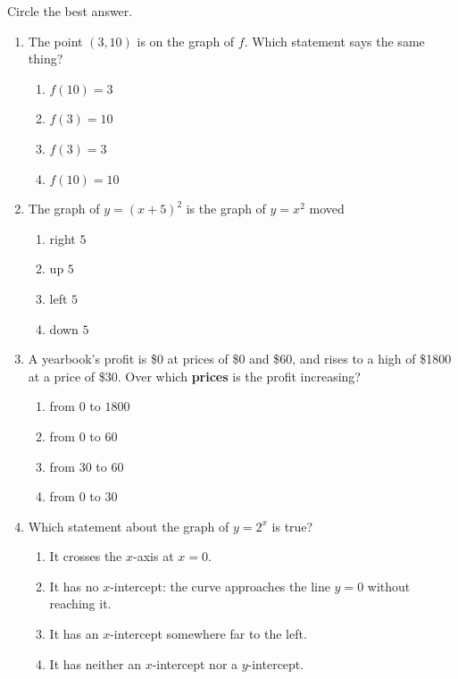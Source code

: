 
\noindent\small Circle the best answer.

\begin{enumerate}[leftmargin=1.8em, itemsep=6pt, topsep=5pt]
\small

\item The point $(3,10)$ is on the graph of $f$. Which statement says the same thing?
\begin{enumerate}[label=(\Alph*), leftmargin=2.2em, itemsep=1pt, topsep=2pt]
  \item $f(10)=3$
  \item $f(3)=10$
  \item $f(3)=3$
  \item $f(10)=10$
\end{enumerate}

\item The graph of $y=(x+5)^2$ is the graph of $y=x^2$ moved
\begin{enumerate}[label=(\Alph*), leftmargin=2.2em, itemsep=1pt, topsep=2pt]
  \item right $5$
  \item up $5$
  \item left $5$
  \item down $5$
\end{enumerate}

\item A yearbook's profit is \$0 at prices of \$0 and \$60, and rises to a high of \$1800 at a
price of \$30. Over which \textbf{prices} is the profit increasing?
\begin{enumerate}[label=(\Alph*), leftmargin=2.2em, itemsep=1pt, topsep=2pt]
  \item from $0$ to $1800$
  \item from $0$ to $60$
  \item from $30$ to $60$
  \item from $0$ to $30$
\end{enumerate}

\item Which statement about the graph of $y=2^x$ is true?
\begin{enumerate}[label=(\Alph*), leftmargin=2.2em, itemsep=1pt, topsep=2pt]
  \item It crosses the $x$-axis at $x=0$.
  \item It has no $x$-intercept: the curve approaches the line $y=0$ without reaching it.
  \item It has an $x$-intercept somewhere far to the left.
  \item It has neither an $x$-intercept nor a $y$-intercept.
\end{enumerate}


\end{enumerate}
